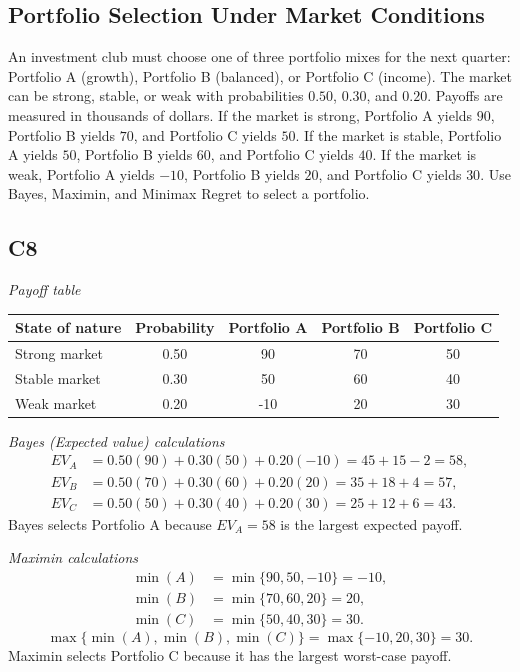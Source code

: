 	\begin{ExamProblems}
		\item
		\subsection*{Portfolio Selection Under Market Conditions}
		An investment club must choose one of three portfolio mixes for the next quarter: Portfolio A (growth), Portfolio B (balanced), or Portfolio C (income).
		The market can be strong, stable, or weak with probabilities $0.50$, $0.30$, and $0.20$. Payoffs are measured in thousands of dollars.
		If the market is strong, Portfolio A yields $90$, Portfolio B yields $70$, and Portfolio C yields $50$.
		If the market is stable, Portfolio A yields $50$, Portfolio B yields $60$, and Portfolio C yields $40$.
		If the market is weak, Portfolio A yields $-10$, Portfolio B yields $20$, and Portfolio C yields $30$.
		Use Bayes, Maximin, and Minimax Regret to select a portfolio.
		
		\subsection*{C8}
		\begin{center}
			\textit{Payoff table} \\
			\begin{tabular}{l c c c c}
				\toprule
				State of nature & Probability & Portfolio A & Portfolio B & Portfolio C \\
				\midrule
				Strong market & 0.50 & 90 & 70 & 50 \\
				Stable market & 0.30 & 50 & 60 & 40 \\
				Weak market & 0.20 & -10 & 20 & 30 \\
				\bottomrule
			\end{tabular}
		\end{center}
		
		\textit{Bayes (Expected value) calculations}
		\[
		\begin{aligned}
		EV_A &= 0.50(90)+0.30(50)+0.20(-10)=45+15-2=58,\\
		EV_B &= 0.50(70)+0.30(60)+0.20(20)=35+18+4=57,\\
		EV_C &= 0.50(50)+0.30(40)+0.20(30)=25+12+6=43.
		\end{aligned}
		\]
		Bayes selects Portfolio A because $EV_A=58$ is the largest expected payoff.
		
		\textit{Maximin calculations}
		\[
		\begin{aligned}
		\min(A) &= \min\{90,50,-10\} = -10,\\
		\min(B) &= \min\{70,60,20\} = 20,\\
		\min(C) &= \min\{50,40,30\} = 30.
		\end{aligned}
		\]
		\[
		\max\{\min(A),\min(B),\min(C)\}=\max\{-10,20,30\}=30.
		\]
		Maximin selects Portfolio C because it has the largest worst-case payoff.
		

\end{ExamProblems}
